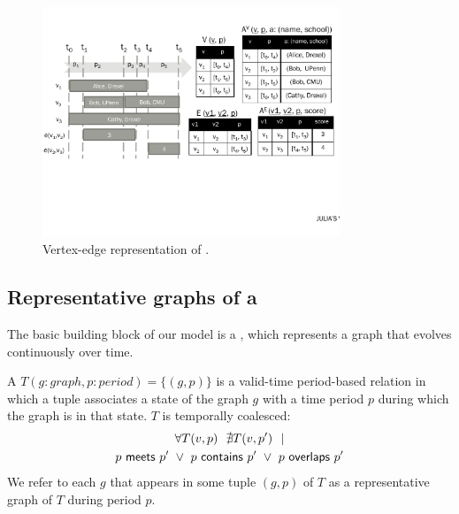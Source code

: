 \begin{figure}
\centering
\includegraphics[width=3.5in]{figs/T1_rel_tab.pdf}
\caption{Vertex-edge representation of \tg {}.}
\label{fig:tg_ve}
\end{figure}



\subsection{Representative graphs of a \tg}
\label{sec:model:rg}

The basic building block of our model is a \tg, which represents a
graph that evolves continuously over time. 

\begin{definition}[TGraph]
A \tg $T(g:graph, p:period) = \{ (g,p) \}$ is a valid-time
period-based relation in which a tuple associates a state of the graph
$g$ with a time period $p$ during which the graph is in that state.
$T$ is temporally coalesced:
\begin{multline}
\forall T(v,p)~~\nexists T(v,p')~~| \\
        p~\mathsf{meets}~p'~\lor~p~\mathsf{contains}~p'~\lor~p~\mathsf{overlaps}~p'
\end{multline}
We refer to each $g$ that appears in some tuple $(g,p)$ of $T$ as a
representative graph of $T$ during period $p$.

\label{def:tg_abstract}
\end{definition}

